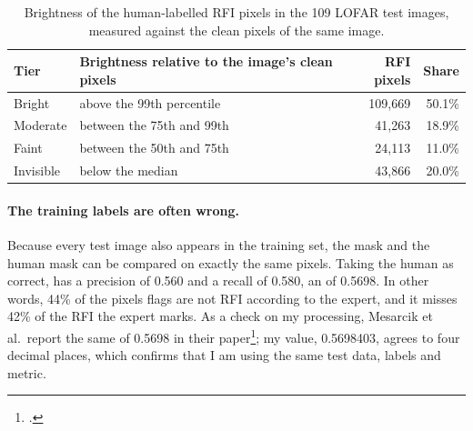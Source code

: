 \begin{table}[H]
  \centering
  \caption{Brightness of the human-labelled RFI pixels in the 109 LOFAR test
    images, measured against the clean pixels of the same image.}
  \label{tab:lofar_tiers}
  \begin{tabular}{llrr}
    \toprule
    Tier & Brightness relative to the image's clean pixels & RFI pixels & Share \\
    \midrule
    Bright    & above the 99th percentile          & 109{,}669 & 50.1\% \\
    Moderate  & between the 75th and 99th          &  41{,}263 & 18.9\% \\
    Faint     & between the 50th and 75th          &  24{,}113 & 11.0\% \\
    Invisible & below the median                   &  43{,}866 & 20.0\% \\
    \bottomrule
  \end{tabular}
\end{table}

\paragraph{The training labels are often wrong.} Because every test image also
appears in the training set, the \aoflagger{} mask and the human mask can be
compared on exactly the same pixels. Taking the human as correct, \aoflagger{}
has a precision of 0.560 and a recall of 0.580, an \Fone{} of 0.5698. In other
words, 44\% of the pixels \aoflagger{} flags are not RFI according to the
expert, and it misses 42\% of the RFI the expert marks. As a check on my processing, Mesarcik et al.\ report the same
\aoflagger{} \Fone{} of 0.5698 in their paper\footcite{mesarcik2022}; my value,
0.5698403, agrees to four decimal places, which confirms that I am using the
same test data, labels and metric.
